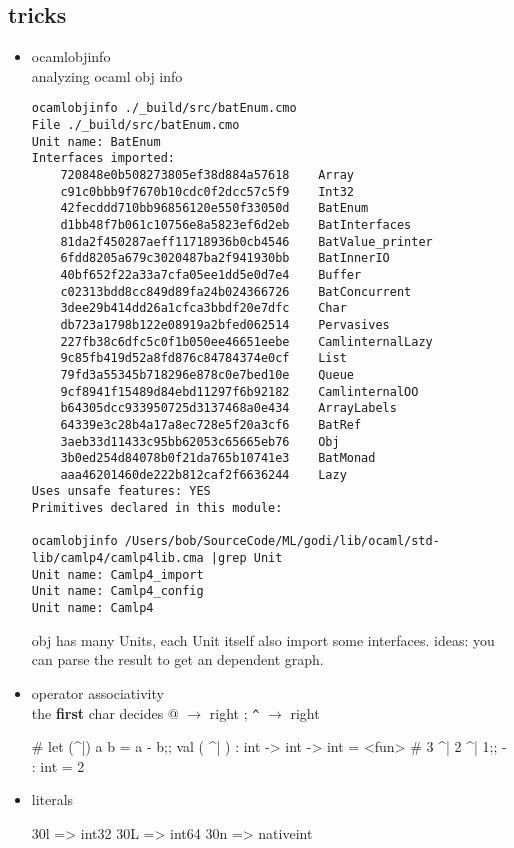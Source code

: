 \subsection{tricks}
\label{sec:tricks}

\begin{itemize}
\item ocamlobjinfo \\
  analyzing ocaml obj info

\begin{Verbatim}[formatcom=\color{blue},fontsize=\scriptsize]
ocamlobjinfo ./_build/src/batEnum.cmo
File ./_build/src/batEnum.cmo
Unit name: BatEnum
Interfaces imported:
	720848e0b508273805ef38d884a57618	Array
	c91c0bbb9f7670b10cdc0f2dcc57c5f9	Int32
	42fecddd710bb96856120e550f33050d	BatEnum
	d1bb48f7b061c10756e8a5823ef6d2eb	BatInterfaces
	81da2f450287aeff11718936b0cb4546	BatValue_printer
	6fdd8205a679c3020487ba2f941930bb	BatInnerIO
	40bf652f22a33a7cfa05ee1dd5e0d7e4	Buffer
	c02313bdd8cc849d89fa24b024366726	BatConcurrent
	3dee29b414dd26a1cfca3bbdf20e7dfc	Char
	db723a1798b122e08919a2bfed062514	Pervasives
	227fb38c6dfc5c0f1b050ee46651eebe	CamlinternalLazy
	9c85fb419d52a8fd876c84784374e0cf	List
	79fd3a55345b718296e878c0e7bed10e	Queue
	9cf8941f15489d84ebd11297f6b92182	CamlinternalOO
	b64305dcc933950725d3137468a0e434	ArrayLabels
	64339e3c28b4a17a8ec728e5f20a3cf6	BatRef
	3aeb33d11433c95bb62053c65665eb76	Obj
	3b0ed254d84078b0f21da765b10741e3	BatMonad
	aaa46201460de222b812caf2f6636244	Lazy
Uses unsafe features: YES
Primitives declared in this module:

ocamlobjinfo /Users/bob/SourceCode/ML/godi/lib/ocaml/std-lib/camlp4/camlp4lib.cma |grep Unit
Unit name: Camlp4_import
Unit name: Camlp4_config
Unit name: Camlp4
\end{Verbatim}
  obj has many Units, each Unit itself also import some
  interfaces. ideas: you can parse the result to get an dependent graph.
\item operator associativity \\
  the \textbf{first} char decides
  @ $\rightarrow$ right ;  \verb|^| $\rightarrow$ right

\begin{alternate}
# let (^|) a b = a - b;;
val ( ^| ) : int -> int -> int = <fun>
# 3 ^| 2 ^| 1;;
- : int = 2
\end{alternate}

\item literals

\begin{bluecode}
30l => int32
30L => int64
30n => nativeint
\end{bluecode}



\end{itemize}
